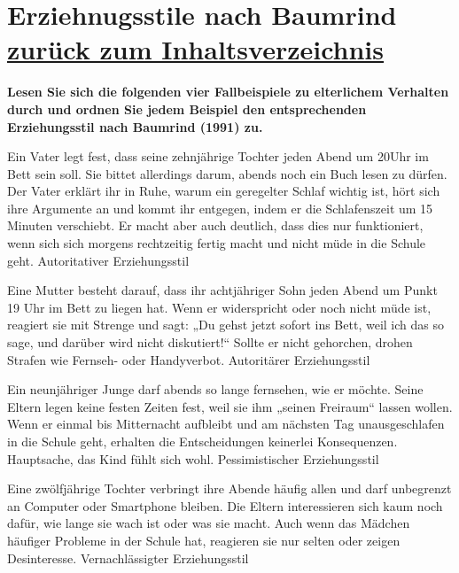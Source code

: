 \documentclass[a4paper]{article}
\newenvironment{question}[2]{%
    \section[#1 \normalfont(#2)]{#1\\\small\normalfont\hyperlink{tableofcontents}{zurück zum Inhaltsverzeichnis}}%
}{%
    \newpage%
}
\newcommand{\questiontext}[1]{\textbf{#1}}
\newenvironment{mapping}[1]{%
    \begin{question}{#1}{Zuordnungsaufgabe}%
    \newcommand{\ismappedto}{\tcblower}%
    \newenvironment{answer}{\begin{mapping-box}}{\end{mapping-box}}%
}{%
    \end{question}%
}
\begin{document}
\begin{mapping}{Erziehnugsstile nach Baumrind}
    \questiontext{Lesen Sie sich die folgenden vier Fallbeispiele zu elterlichem Verhalten durch und ordnen Sie jedem Beispiel den entsprechenden Erziehungsstil nach Baumrind (1991) zu.}
    \begin{answer}
        Ein Vater legt fest, dass seine zehnjährige Tochter jeden Abend um 20Uhr im Bett sein soll. Sie bittet allerdings darum, abends noch ein Buch lesen zu dürfen. Der Vater erklärt ihr in Ruhe, warum ein geregelter Schlaf wichtig ist, hört sich ihre Argumente an und kommt ihr entgegen, indem er die Schlafenszeit um 15 Minuten verschiebt. Er macht aber auch deutlich, dass dies nur funktioniert, wenn sich sich morgens rechtzeitig fertig macht und nicht müde in die Schule geht.
        \ismappedto
        Autoritativer Erziehungsstil
    \end{answer}
    \begin{answer}
        Eine Mutter besteht darauf, dass ihr achtjähriger Sohn jeden Abend um Punkt 19 Uhr im Bett zu liegen hat. Wenn er widerspricht oder noch nicht müde ist, reagiert sie mit Strenge und sagt: „Du gehst jetzt sofort ins Bett, weil ich das so sage, und darüber wird nicht diskutiert!“ Sollte er nicht gehorchen, drohen Strafen wie Fernseh- oder Handyverbot.
        \ismappedto
        Autoritärer Erziehungsstil
    \end{answer}
    \begin{answer}
        Ein neunjähriger Junge darf abends so lange fernsehen, wie er möchte. Seine Eltern legen keine festen Zeiten fest, weil sie ihm „seinen Freiraum“ lassen wollen. Wenn er einmal bis Mitternacht aufbleibt und am nächsten Tag unausgeschlafen in die Schule geht, erhalten die Entscheidungen keinerlei Konsequenzen. Hauptsache, das Kind fühlt sich wohl.
        \ismappedto
        Pessimistischer Erziehungsstil
    \end{answer}
    \begin{answer}
        Eine zwölfjährige Tochter verbringt ihre Abende häufig allen und darf unbegrenzt an Computer oder Smartphone bleiben. Die Eltern interessieren sich kaum noch dafür, wie lange sie wach ist oder was sie macht. Auch wenn das Mädchen häufiger Probleme in der Schule hat, reagieren sie nur selten oder zeigen Desinteresse.
        \ismappedto
        Vernachlässigter Erziehungsstil
    \end{answer}
\end{mapping}
\end{document}
